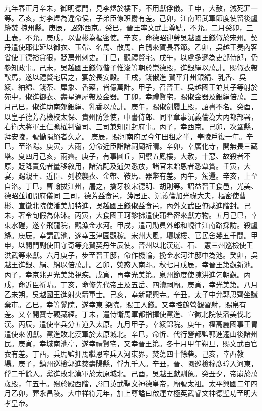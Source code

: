 \begin{pinyinscope}
 九年春正月辛未，御明德門，見李煜於樓下，不用獻俘儀。壬申，大赦，減死罪一等。乙亥，封李煜為違命侯，子弟臣僚班爵有差。己卯，江南昭武軍節度使留後盧絳焚
 掠州縣。庚辰，詔郊西京。癸巳，晉王率文武上尊號，不允。二月癸卯，三上表，不允。庚戌，以曹彬為樞密使。辛亥，命德昭迎勞吳越國王錢俶於宋州。契丹遣使耶律延以御衣、玉帶、名馬、散馬、白鶻來賀長春節。乙卯，吳越王奏內客省使丁德裕貪狠，貶房州刺史。丁巳，觀禮賢宅。戊午，以盧多遜為吏部侍郎，仍參知政事。己未，吳越國王錢俶偕子惟浚等朝於崇德殿，進銀絹以萬計。賜俶衣帶鞍馬，遂以禮賢宅居之，宴於長安殿。壬戌，錢俶進
 賀平升州銀絹、乳香、吳綾、紬綿、錢茶、犀象、香藥，皆億萬計。甲子，召晉王、吳越國王並其子等射於苑中，俶進御衣、壽星通犀帶及金器。丁卯，幸禮賢宅，賜俶金器及銀絹倍萬。三月己巳，俶進助南郊銀絹、乳香以萬計。庚午，賜俶劍履上殿，詔書不名。癸酉，以皇子德芳為檢校太保、貴州防禦使，中書侍郎、同平章事沉義倫為大內都部署，右衛大將軍王仁贍權判留司、三司兼知開封府事。丙子，幸西京。己卯，次鞏縣，拜安陵，號慟隕絕者久之。
 庚辰，賜河南府民今年田租之半，奉陵戶復一年。辛巳，至洛陽。庚寅，大雨，分命近臣詣諸祠廟祈晴。辛卯，幸廣化寺，開無畏三藏塔。夏四月己亥，雨霽。庚子，有事圓丘，回禦五鳳樓，大赦，十惡、故殺者不原，貶降責免者量移敘用，諸流配及逋欠悉放，諸官未贈恩者悉覃賞。壬寅，大宴，賜親王、近臣、列校襲衣、金帶、鞍馬、器幣有差。丙午，駕還。辛亥，上至自洛。丁巳，曹翰拔江州，屠之，擒牙校宋德明、胡則等。詔益晉王食邑，光美、德昭並加開府儀同
 三司，德芳益食邑，薛居正、沉義倫加光祿大夫，樞密使曹彬、宣徽北院使潘美加特進，吳越國王錢俶益食邑，內外文武臣僚咸進階封。己未，著令旬假為休沐。丙寅，大食國王珂黎拂遣使蒲希密來獻方物。五月己巳，幸東水磑，遂幸飛龍院，觀漁金水河。甲戌，遣司勛員外郎和峴往江南路採訪。殺盧絳。庚辰，幸講武池，遂幸玉津園觀稼。宋州大風，壞城樓、官民舍幾五千間。甲申，以閣門副使田守奇等充賀契丹生辰使。晉州以北漢嵐、石、
 憲三州巡檢使王洪武等來獻。六月庚子，步至晉王邸，命作機輪，挽金水河注邸中為池。癸卯，吳越王進銀、絹、綿以倍萬計。乙卯，熒惑入南斗。秋七月戊辰，幸晉王第觀新池。丙子，幸京兆尹光美第視疾。戊寅，再幸光美第。泉州節度使陳洪進乞朝覲。丙戌，命近臣祈晴。丁亥，命修先代帝王及五岳、四瀆祠廟。庚寅，幸光美第。八月乙未朔，吳越國王進射火箭軍士。己亥，幸新龍興寺。辛丑，太子中允郭思齊坐贓棄市。乙巳，幸等覺院，遂幸東
 染院，賜工人錢。又幸控鶴營觀習射，賜帛有差。又幸開寶寺觀藏經。丁未，遣侍衛馬軍都指揮使黨進、宣徽北院使潘美伐北漢。丙辰，遣使率兵分五道入太原。九月甲子，幸綾錦院。庚午，權高麗國事王胄遣使來朝獻。黨進敗北漢軍於太原城北。辛巳，命忻、代行營都監郭進遷山後諸州民。庚寅，幸城南池亭，遂幸禮賢宅，又幸晉王第。冬十月甲午朔旦，賜文武百官衣有差。丁酉，兵馬監押馬繼恩率兵入河東界，焚蕩四十餘砦。己亥，幸西教
 場。庚子，鎮州巡檢郭進焚壽陽縣，俘九千人。辛丑，晉、隰巡檢穆彥璋入河東，俘二千餘人。黨進敗北漢軍於太原城北。己酉，吳越王獻馴象。癸丑夕，帝崩於萬歲殿，年五十。殯於殿西階，謚曰英武聖文神德皇帝，廟號太祖。太平興國二年四月乙卯，葬永昌陵。大中祥符元年，加上尊謚曰啟運立極英武睿文神德聖功至明大孝皇帝。




\end{pinyinscope}
